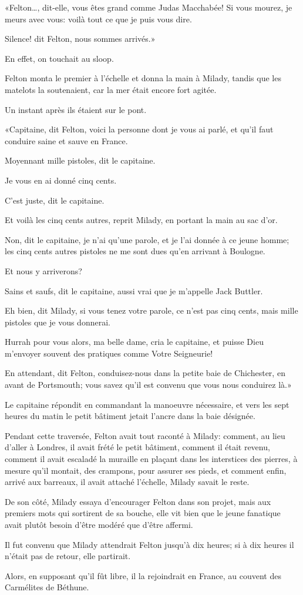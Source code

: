 «Felton\dots, dit-elle, vous êtes grand comme Judas Macchabée! Si vous mourez, je meurs avec vous: voilà tout ce que je puis vous dire. 

\speak  Silence! dit Felton, nous sommes arrivés.» 

En effet, on touchait au sloop. 

Felton monta le premier à l'échelle et donna la main à Milady, tandis que les matelots la soutenaient, car la mer était encore fort agitée. 

Un instant après ils étaient sur le pont. 

«Capitaine, dit Felton, voici la personne dont je vous ai parlé, et qu'il faut conduire saine et sauve en France. 

\speak  Moyennant mille pistoles, dit le capitaine. 

\speak  Je vous en ai donné cinq cents. 

\speak  C'est juste, dit le capitaine. 

\speak  Et voilà les cinq cents autres, reprit Milady, en portant la main au sac d'or. 

\speak  Non, dit le capitaine, je n'ai qu'une parole, et je l'ai donnée à ce jeune homme; les cinq cents autres pistoles ne me sont dues qu'en arrivant à Boulogne. 

\speak  Et nous y arriverons? 

\speak  Sains et saufs, dit le capitaine, aussi vrai que je m'appelle Jack Buttler. 

\speak  Eh bien, dit Milady, si vous tenez votre parole, ce n'est pas cinq cents, mais mille pistoles que je vous donnerai. 

\speak  Hurrah pour vous alors, ma belle dame, cria le capitaine, et puisse Dieu m'envoyer souvent des pratiques comme Votre Seigneurie! 

\speak  En attendant, dit Felton, conduisez-nous dans la petite baie de Chichester, en avant de Portsmouth; vous savez qu'il est convenu que vous nous conduirez là.» 

Le capitaine répondit en commandant la manoeuvre nécessaire, et vers les sept heures du matin le petit bâtiment jetait l'ancre dans la baie désignée. 

Pendant cette traversée, Felton avait tout raconté à Milady: comment, au lieu d'aller à Londres, il avait frété le petit bâtiment, comment il était revenu, comment il avait escaladé la muraille en plaçant dans les interstices des pierres, à mesure qu'il montait, des crampons, pour assurer ses pieds, et comment enfin, arrivé aux barreaux, il avait attaché l'échelle, Milady savait le reste. 

De son côté, Milady essaya d'encourager Felton dans son projet, mais aux premiers mots qui sortirent de sa bouche, elle vit bien que le jeune fanatique avait plutôt besoin d'être modéré que d'être affermi. 

Il fut convenu que Milady attendrait Felton jusqu'à dix heures; si à dix heures il n'était pas de retour, elle partirait. 

Alors, en supposant qu'il fût libre, il la rejoindrait en France, au couvent des Carmélites de Béthune. 